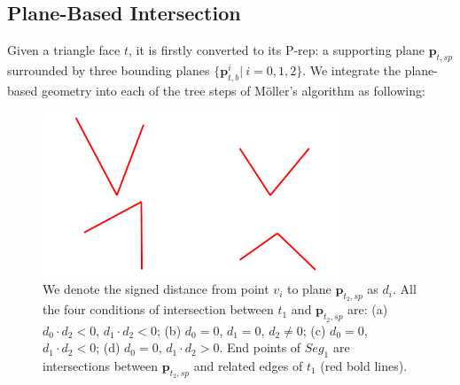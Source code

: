 \documentclass[10pt,journal,compsoc]{IEEEtran}
\begin{document}
\subsection{Plane-Based Intersection}

\label{sec:embed}
Given a triangle face $t$, it is firstly converted to its P-rep: a supporting plane $\bm{p}_{t, sp}$ surrounded by three bounding planes $\{\bm{p}_{t, b}^i|\ i = 0,1,2\}$. We integrate the plane-based geometry into each of the tree steps of M\"{o}ller's algorithm as following:

\begin{figure}[t]
\centering
\includegraphics[width=3.5in]{sign}
\caption{We denote the signed distance from point $v_i$ to plane $\bm{p}_{t_2, sp}$ as $d_i$. All the four conditions of intersection between $t_1$ and $\bm{p}_{t_2, sp}$ are:  (a) $d_0\cdot d_2<0$, $d_1\cdot d_2<0$; (b) $d_0=0$, $d_1=0$, $d_2\neq 0$; (c) $d_0=0$, $d_1\cdot d_2<0$; (d) $d_0=0$, $d_1\cdot d_2>0$. End points of $Seg_1$ are intersections between $\bm{p}_{t_2, sp}$ and related edges of $t_1$ (red bold lines).}
\label{fig:isect}
\end{figure}
\end{document}
